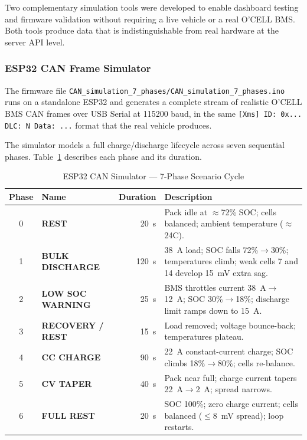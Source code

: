 Two complementary simulation tools were developed to enable dashboard testing and firmware validation without requiring a live vehicle or a real O'CELL BMS. Both tools produce data that is indistinguishable from real hardware at the server API level.

\subsubsection*{ESP32 CAN Frame Simulator}

The firmware file \texttt{CAN\_simulation\_7\_phases/CAN\_simulation\_7\_phases.ino} runs on a standalone ESP32 and generates a complete stream of realistic O'CELL BMS CAN frames over USB Serial at 115200 baud, in the same \texttt{[Xms] ID: 0x... DLC: N Data: ...} format that the real vehicle produces.

The simulator models a full charge/discharge lifecycle across seven sequential phases. Table~\ref{tab:sim-phases} describes each phase and its duration.

\begin{table}[H]
\centering
\caption{ESP32 CAN Simulator --- 7-Phase Scenario Cycle}
\label{tab:sim-phases}
\small
\begin{tabular}{c >{\bfseries}p{3.5cm} r p{6.0cm}}
\toprule
Phase & Name & Duration & Description \\
\midrule
0 & REST             & 20~s  & Pack idle at $\approx$72\% SOC; cells balanced; ambient temperature ($\approx$24\textdegree{}C). \\
1 & BULK DISCHARGE   & 120~s & 38~A load; SOC falls 72\%$\to$30\%; temperatures climb; weak cells 7 and 14 develop 15~mV extra sag. \\
2 & LOW SOC WARNING  & 25~s  & BMS throttles current 38~A$\to$12~A; SOC 30\%$\to$18\%; discharge limit ramps down to 15~A. \\
3 & RECOVERY / REST  & 15~s  & Load removed; voltage bounce-back; temperatures plateau. \\
4 & CC CHARGE        & 90~s  & 22~A constant-current charge; SOC climbs 18\%$\to$80\%; cells re-balance. \\
5 & CV TAPER         & 40~s  & Pack near full; charge current tapers 22~A$\to$2~A; spread narrows. \\
6 & FULL REST        & 20~s  & SOC 100\%; zero charge current; cells balanced ($\leq$8~mV spread); loop restarts. \\
\bottomrule
\end{tabular}
\end{table}

